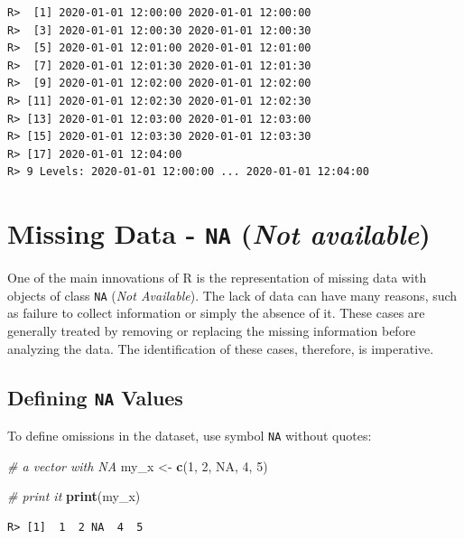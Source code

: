 \documentclass[
  12pt,
]{book}
\newenvironment{Shaded}{\begin{snugshade}}{\end{snugshade}}
\newcommand{\CommentTok}[1]{\textcolor[rgb]{0.37,0.37,0.37}{\textit{#1}}}
\newcommand{\DecValTok}[1]{\textcolor[rgb]{0.06,0.06,0.06}{#1}}
\newcommand{\KeywordTok}[1]{\textcolor[rgb]{0.27,0.27,0.27}{\textbf{#1}}}
\newcommand{\NormalTok}[1]{#1}
\newcommand{\OtherTok}[1]{\textcolor[rgb]{0.37,0.37,0.37}{#1}}
\newcommand{\StringTok}[1]{\textcolor[rgb]{0.5,0.5,0.5}{#1}}
\begin{document}
\begin{verbatim}
R>  [1] 2020-01-01 12:00:00 2020-01-01 12:00:00
R>  [3] 2020-01-01 12:00:30 2020-01-01 12:00:30
R>  [5] 2020-01-01 12:01:00 2020-01-01 12:01:00
R>  [7] 2020-01-01 12:01:30 2020-01-01 12:01:30
R>  [9] 2020-01-01 12:02:00 2020-01-01 12:02:00
R> [11] 2020-01-01 12:02:30 2020-01-01 12:02:30
R> [13] 2020-01-01 12:03:00 2020-01-01 12:03:00
R> [15] 2020-01-01 12:03:30 2020-01-01 12:03:30
R> [17] 2020-01-01 12:04:00
R> 9 Levels: 2020-01-01 12:00:00 ... 2020-01-01 12:04:00
\end{verbatim}

\hypertarget{missing-data---na-not-available}{%
\section{\texorpdfstring{Missing Data - \texttt{NA} (\emph{Not available})}{Missing Data - NA (Not available)}}\label{missing-data---na-not-available}}

One of the main innovations of R is the representation of missing data with objects of class \texttt{NA} (\emph{Not Available}). The lack of data can have many reasons, such as failure to collect information or simply the absence of it. These cases are generally treated by removing or replacing the missing information before analyzing the data. The identification of these cases, therefore, is imperative. 

\hypertarget{defining-na-values}{%
\subsection{\texorpdfstring{Defining \texttt{NA} Values}{Defining NA Values}}\label{defining-na-values}}

To define omissions in the dataset, use symbol \texttt{NA} without quotes:

\begin{Shaded}
\begin{Highlighting}[]
\CommentTok{# a vector with NA}
\NormalTok{my_x <-}\StringTok{ }\KeywordTok{c}\NormalTok{(}\DecValTok{1}\NormalTok{, }\DecValTok{2}\NormalTok{, }\OtherTok{NA}\NormalTok{, }\DecValTok{4}\NormalTok{, }\DecValTok{5}\NormalTok{)}

\CommentTok{# print it}
\KeywordTok{print}\NormalTok{(my_x)}
\end{Highlighting}
\end{Shaded}

\begin{verbatim}
R> [1]  1  2 NA  4  5
\end{verbatim}
\end{document}
